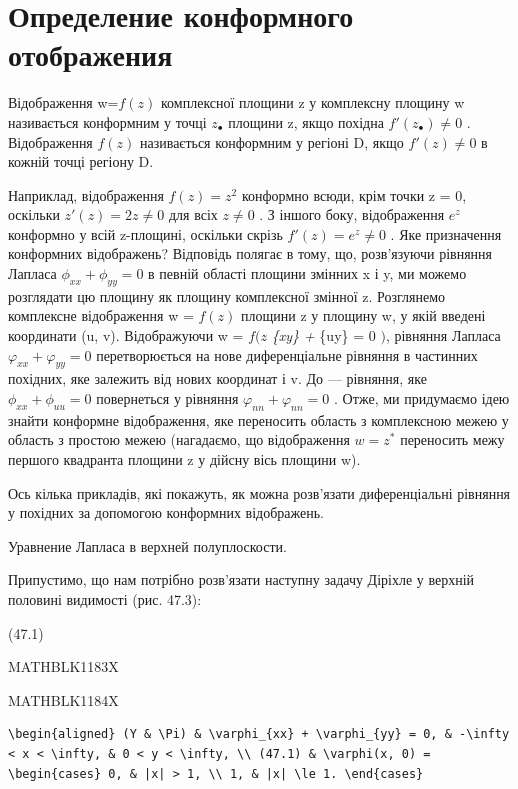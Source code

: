 \documentclass[
  ukrainian,
]{article}
\author{}
\date{}
\begin{document}
\section{Определение конформного
отображения}\label{ux43eux43fux440ux435ux434ux435ux43bux435ux43dux438ux435-ux43aux43eux43dux444ux43eux440ux43cux43dux43eux433ux43e-ux43eux442ux43eux431ux440ux430ux436ux435ux43dux438ux44f}

Відображення w=\(f(z)\) комплексної площини z у комплексну площину w
називається конформним у точці \(z_{\bullet}\) площини z, якщо похідна
\(f'(z_{\bullet}) \neq 0\) . Відображення \(f(z)\) називається
конформним у регіоні D, якщо \(f'(z) \neq 0\) в кожній точці регіону D.

Наприклад, відображення \(f(z) = z^2\) конформно всюди, крім точки z =
0, оскільки \(z'(z) = 2z \neq 0\) для всіх \(z \neq 0\) . З іншого боку,
відображення \(e^z\) конформно у всій z-площині, оскільки скрізь
\(f'(z) = e^z \neq 0\) . Яке призначення конформних відображень?
Відповідь полягає в тому, що, розв'язуючи рівняння Лапласа
\(\phi_{xx} + \phi_{yy} = 0\) в певній області площини змінних x і y, ми
можемо розглядати цю площину як площину комплексної змінної z.
Розглянемо комплексне відображення w = \(f(z)\) площини z у площину w, у
якій введені координати (u, v). Відображуючи w = \(f(z\)
\phi\emph{\{xy\} + \phi}\{uy\} = 0 \()\), рівняння Лапласа
\(\varphi_{xx} + \varphi_{yy} = 0\) перетворюється на нове
диференціальне рівняння в частинних похідних, яке залежить від нових
координат і v. До --- рівняння, яке \(\phi_{xx} + \phi_{uu} = 0\)
повернеться у рівняння \(\varphi_{nn} + \varphi_{nn} = 0\) . Отже, ми
придумаємо ідею знайти конформне відображення, яке переносить область з
комплексною межею у область з простою межею (нагадаємо, що відображення
\(w=z^*\) переносить межу першого квадранта площини z у дійсну вісь
площини w).

Ось кілька прикладів, які покажуть, як можна розв'язати диференціальні
рівняння у похідних за допомогою конформних відображень.

Уравнение Лапласа в верхней полуплоскости.

Припустимо, що нам потрібно розв'язати наступну задачу Діріхле у верхній
половині видимості (рис. 47.3):

(47.1)

MATHBLK1183X

MATHBLK1184X

\begin{verbatim}
\begin{aligned} (Y & \Pi) & \varphi_{xx} + \varphi_{yy} = 0, & -\infty < x < \infty, & 0 < y < \infty, \\ (47.1) & \varphi(x, 0) = \begin{cases} 0, & |x| > 1, \\ 1, & |x| \le 1. \end{cases}
\end{verbatim}
\end{document}
